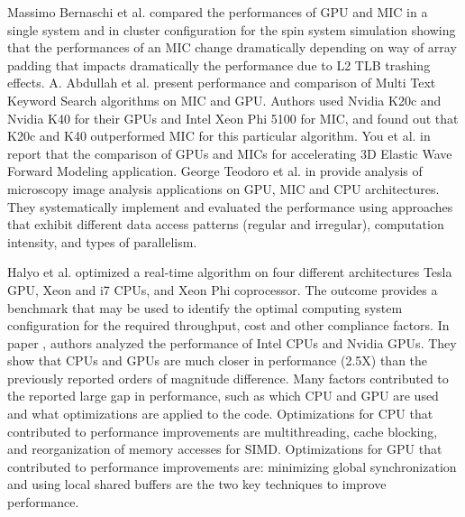 
Massimo Bernaschi et al. \cite{R:10} compared the performances of 
GPU and MIC in a single system and in cluster configuration for the spin system simulation 
showing that the performances of an MIC change dramatically depending on way of array padding that impacts dramatically the performance
 due to L2 TLB trashing effects.  
A. Abdullah et al. \cite{R:12} present performance and comparison of Multi Text Keyword Search algorithms on MIC and GPU. 
Authors used Nvidia K20c and Nvidia K40 for their GPUs and Intel Xeon Phi 5100 for MIC, and found out that K20c and K40 outperformed MIC for this particular algorithm. 
You et al. in \cite{R:8} report that the comparison of GPUs and MICs for accelerating 3D Elastic Wave Forward
Modeling application. 
George Teodoro et al. in \cite{R:9} provide analysis of microscopy image analysis applications on GPU, MIC and CPU architectures. 
They systematically implement and evaluated the performance using approaches that exhibit different data access patterns (regular and irregular), computation intensity, and types of parallelism. %



Halyo et al. \cite{halyo2014first} optimized a real-time algorithm on four different architectures Tesla GPU, Xeon and i7 CPUs, and Xeon Phi coprocessor. The outcome provides a benchmark that may be used to identify the optimal computing system configuration for the required throughput, cost and other compliance factors.
In paper \cite{lee2010debunking}, authors analyzed the performance of Intel CPUs and Nvidia GPUs. They show that CPUs and GPUs are much closer in performance (2.5X) than the previously reported orders of magnitude difference. Many factors contributed to the reported large gap in performance, such as which CPU and GPU are used and what optimizations are applied to the code. Optimizations for CPU that contributed to performance improvements are multithreading, cache blocking, and reorganization of memory accesses for SIMD. Optimizations for GPU that contributed to performance improvements are: minimizing global synchronization and using local shared buffers are the two key techniques to improve performance.  




